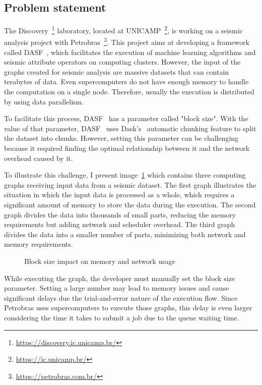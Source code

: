 \subsection{Problem statement}
\label{subsec:problem-statement}

The Discovery~\footnote{\url{https://discovery.ic.unicamp.br/}} laboratory, located at \ac{UNICAMP}~\footnote{\url{https://ic.unicamp.br/}}, is working on a seismic analysis project with Petrobras~\footnote{\url{https://petrobras.com.br/}}.
This project aims at developing a framework called \ac{DASF}~\cite{dasf}, which facilitates the execution of machine learning algorithms and seismic attribute operators on computing clusters.
However, the input of the graphs created for seismic analysis are massive datasets that can contain terabytes of data.
Even supercomputers do not have enough memory to handle the computation on a single node.
Therefore, usually the execution is distributed by using data parallelism.

To facilitate this process, \ac{DASF}~\cite{dasf} has a parameter called "block size".
With the value of that parameter, \ac{DASF}~\cite{dasf} uses Dask's~\cite{dask} automatic chunking feature to split the dataset into chunks.
However, setting this parameter can be challenging because it required finding the optimal relationship between it and the network overhead caused by it.

To illustrate this challenge, I present image~\ref{fig:block-size} which contains three computing graphs receiving input data from a seismic dataset.
The first graph illustrates the situation in which the input data is processed as a whole, which requires a significant amount of memory to store the data during the execution.
The second graph divides the data into thousands of small parts, reducing the memory requirements but adding network and scheduler overhead.
The third graph divides the data into a smaller number of parts, minimizing both network and memory requirements.

\begin{figure}[ht]
  \caption{Block size impact on memory and network usage}
  \label{fig:block-size}
\end{figure}

While executing the graph, the developer must manually set the block size parameter.
Setting a large number may lead to memory issues and cause significant delays due the trial-and-error nature of the execution flow.
Since Petrobras uses supercomputers to execute those graphs, this delay is even larger considering the time it takes to submit a job due to the queue waiting time.

